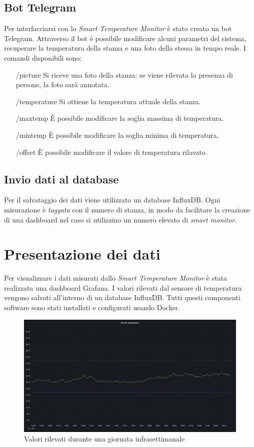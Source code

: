 \documentclass[italian,12pt,a4paper,oneside,final]{report}
\begin{document}
\subsection{Bot Telegram}
Per interfacciarsi con lo \emph{Smart Temperature Monitor} è stato creato un bot Telegram.
Attraverso il bot è possibile modificare alcuni parametri del sistema, recuperare la temperatura della stanza e una foto della stessa in tempo reale.
I comandi disponibili sono:

\begin{itemize}
	\item[/picture] Si riceve una foto della stanza: se viene rilevata la presenza di persone, la foto sarà annotata.
	\item[/temperature] Si ottiene la temperatura attuale della stanza.
	\item[/maxtemp] È possibile modificare la soglia massima di temperatura.
	\item[/mintemp] È possibile modificare la soglia minima di temperatura.
	\item[/offset] È possibile modificare il valore di temperatura rilavato.
\end{itemize}

\subsection{Invio dati al database}
Per il salvataggio dei dati viene utilizzato un database InfluxDB.
Ogni misurazione è \textit{taggata} con il numero di stanza, in modo da facilitare la creazione di una dashboard nel caso si utilizzino un numero elevato di \emph{smart monitor}.

\newpage
\section{Presentazione dei dati}
Per visualizzare i dati misurati dallo \emph{Smart Temperature Monitor} è stata realizzata una dashboard Grafana.
I valori rilevati dal sensore di temperatura vengono salvati all'interno di un database InfluxDB.
Tutti questi componenti software sono stati installati e configurati usando Docker.

\begin{figure}[h]
	\centering
	\includegraphics[width=1\textwidth]{grafana_room.png}
	\caption{Valori rilevati durante una giornata infrasettimanale}
	\label{fig:grafana_stanza}
\end{figure}
\end{document}
